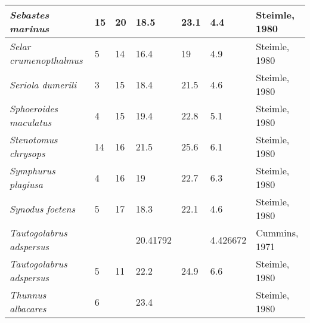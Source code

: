\documentclass[a4paper]{article} %
\begin{document}
\begin{landscape}
\begin{longtable}[]{|l|p{1.8cm}|p{2cm}|p{2cm}|p{2.15cm}|p{1.9cm}|l|}
    \textit{Sebastes marinus}                & 15                           & 20                         & 18.5                          & 23.1                              & 4.4                      & Steimle, 1980                \\ \hline
    \textit{Selar crumenopthalmus}           & 5                            & 14                         & 16.4                          & 19                                & 4.9                      & Steimle, 1980                \\ \hline
    \textit{Seriola dumerili}                & 3                            & 15                         & 18.4                          & 21.5                              & 4.6                      & Steimle, 1980                \\ \hline
    \textit{Sphoeroides maculatus}           & 4                            & 15                         & 19.4                          & 22.8                              & 5.1                      & Steimle, 1980                \\ \hline
    \textit{Stenotomus chrysops}             & 14                           & 16                         & 21.5                          & 25.6                              & 6.1                      & Steimle, 1980                \\ \hline
    \textit{Symphurus plagiusa}              & 4                            & 16                         & 19                            & 22.7                              & 6.3                      & Steimle, 1980                \\ \hline
    \textit{Synodus foetens}                 & 5                            & 17                         & 18.3                          & 22.1                              & 4.6                      & Steimle, 1980                \\ \hline
    \textit{Tautogolabrus adspersus}         &                              &                            & 20.41792                      &                                   & 4.426672                 & Cummins, 1971                \\ \hline
    \textit{Tautogolabrus adspersus}         & 5                            & 11                         & 22.2                          & 24.9                              & 6.6                      & Steimle, 1980                \\ \hline
    \textit{Thunnus albacares}               & 6                            &                            & 23.4                          &                                   &                          & Steimle, 1980                \\ \hline

\end{longtable}
\end{landscape}
\end{document}
